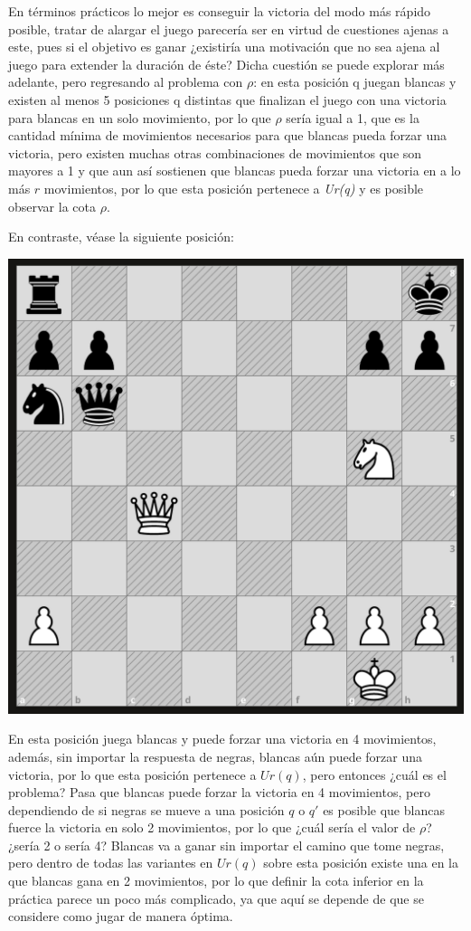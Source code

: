 \documentclass[twoside,openright,12pt,a4paper,spanish]{book}
\begin{document}
En términos prácticos lo mejor es conseguir la victoria del modo más rápido posible, tratar de alargar el juego parecería ser en virtud de cuestiones ajenas a este, pues si el objetivo es ganar ¿existiría una motivación que no sea ajena al juego para extender la duración de éste? Dicha cuestión se puede explorar más adelante, pero regresando al problema con $\rho$: en esta posición q juegan blancas y existen al menos 5 posiciones q distintas que finalizan el juego con una victoria para blancas en un solo movimiento, por lo que $\rho$ sería igual a 1, que es la cantidad mínima de movimientos necesarios para que blancas pueda forzar una victoria, pero existen muchas otras combinaciones de movimientos que son mayores a 1 y que aun así sostienen que blancas pueda forzar una victoria en a lo más $r$ movimientos, por lo que esta posición pertenece a \emph{Ur(q)} y es posible observar la cota $\rho$.

En contraste, véase la siguiente posición:
\medskip
\begin{center}
    \includegraphics[width=8.0 cm,height=8.0 cm]{mate_de_la_coz.png}
\end{center}

En esta posición juega blancas y puede forzar una victoria en 4 movimientos, además, sin importar la respuesta de negras, blancas aún puede forzar una victoria, por lo que esta posición pertenece a $Ur(q)$, pero entonces ¿cuál es el problema? Pasa que blancas puede forzar la victoria en 4 movimientos, pero dependiendo de si negras se mueve a una posición $q$ o $q'$ es posible que blancas fuerce la victoria en solo 2 movimientos, por lo que ¿cuál sería el valor de $\rho$? ¿sería 2 o sería 4? Blancas va a ganar sin importar el camino que tome negras, pero dentro de todas las variantes en $Ur(q)$ sobre esta posición existe una en la que blancas gana en 2 movimientos, por lo que definir la cota inferior en la práctica parece un poco más complicado, ya que aquí se depende de que se considere como jugar de manera óptima.
\end{document}
